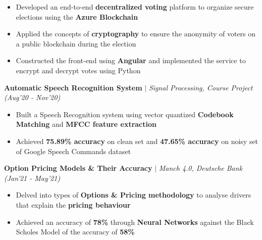 \documentclass[10.2pt]{article}
\begin{document}
	\begin{itemize}[label={\textbullet},itemsep = -1 mm, leftmargin=*]
     \item Developed an end-to-end \textbf{decentralized voting} platform to organize secure elections using the \textbf{Azure Blockchain}
     \item Applied the concepts of \textbf{cryptography} to ensure the anonymity of voters on a public blockchain during the election
     \item Constructed the front-end using \textbf{Angular} and implemented the service to encrypt and decrypt votes using Python 
\end{itemize}
\vspace{-6pt}
   \textbf{Automatic Speech Recognition System} $|$  \textit{Signal Processing, Course Project} \hfill{\sl \small (Aug'20 - Nov’20)} \\
    \vspace{-0.3cm}
    \hline 
    \vspace{-4pt}    
\begin{itemize}[label={\textbullet},itemsep = -1 mm, leftmargin=*]
    \item Built a Speech Recognition system using vector quantized \textbf{Codebook Matching} and \textbf{MFCC feature extraction}
    \item Achieved \textbf{75.89\% accuracy} on clean set and\textbf{ 47.65\% accuracy} on noisy set of Google Speech Commands dataset
\end{itemize}
\vspace{-6pt}
     \textbf{Option Pricing Models \& Their Accuracy} $|$  \textit{Manch 4.0, Deutsche Bank} \hfill{\sl \small (Jan’21 - May’21)} \\
    \vspace{-0.3cm}
    \hline 
    \vspace{-4pt}    
\begin{itemize}[label={\textbullet},itemsep = -1 mm, leftmargin=*]
    \item Delved into types of \textbf{Options \& Pricing methodology} to analyse drivers that explain the \textbf{pricing behaviour} 
    \item Achieved an accuracy of \textbf{78\%} through \textbf{Neural Networks} against the Black Scholes Model of the accuracy of \textbf{58\%}
\end{itemize}
\end{document}

